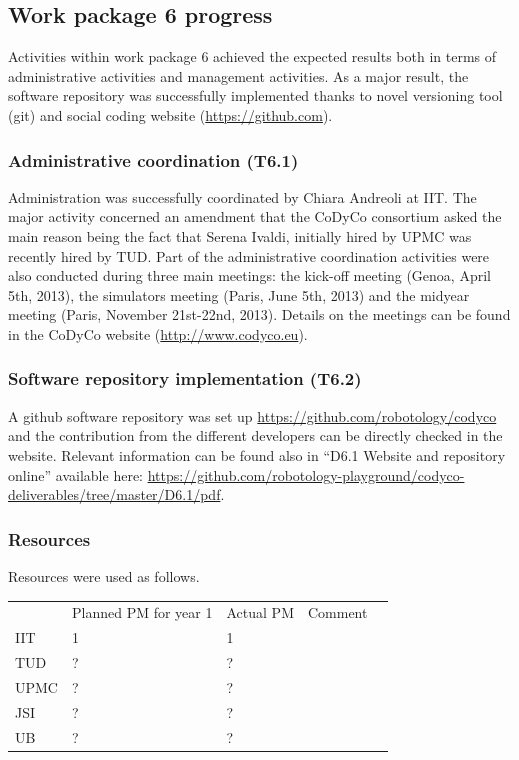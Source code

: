 \documentclass[12pt,a4paper,twoside]{article}
\begin{document}
\subsection{Work package 6 progress}

Activities within work package 6 achieved the expected results both in terms of administrative activities and management activities. As a major result, the software repository was successfully implemented thanks to novel versioning tool (git) and social coding website (\url{https://github.com}).

\subsubsection{Administrative coordination (T6.1)}
Administration was successfully coordinated by Chiara Andreoli at IIT. The major activity concerned an amendment that the CoDyCo consortium asked the main reason being the fact that Serena Ivaldi, initially hired by UPMC was recently hired by TUD. Part of the administrative coordination activities were also conducted during three main meetings: the kick-off meeting (Genoa, April 5th, 2013), the simulators meeting (Paris, June 5th, 2013) and the midyear meeting (Paris, November 21st-22nd, 2013). Details on the meetings can be found in the CoDyCo website (\url{http://www.codyco.eu}).

\subsubsection{Software repository implementation (T6.2)}

A github software repository was set up \url{https://github.com/robotology/codyco} and the contribution from the different developers can be directly checked in the website. Relevant information can be found also in ``D6.1 Website and repository online'' available here: \url{https://github.com/robotology-playground/codyco-deliverables/tree/master/D6.1/pdf}.

\subsubsection{Resources}

Resources were used as follows.

\begin{center}
\begin{tabular}{|l|l|l|l|l}
\cline{1-4}
 & Planned PM for year 1 & Actual PM & Comment & \\ \cline{1-4}
IIT        & 1 & 1 &  &  \\ \cline{1-4}
TUD    & ? & ? &  &  \\ \cline{1-4}
UPMC & ? & ? &  &  \\ \cline{1-4}
JSI       & ? & ? &  &  \\ \cline{1-4}
UB       & ? & ? &  &  \\ \cline{1-4}
\end{tabular}
\end{center}
\end{document}
